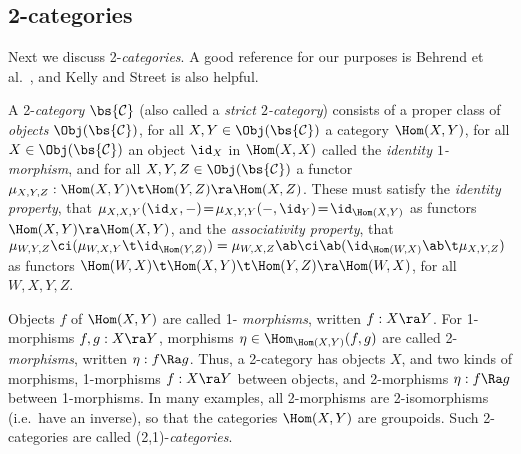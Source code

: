 \documentclass{article}
\begin{document}
\subsection{2-categories}
\label{dsA3}

Next we discuss 2-{\it categories}. A good reference for our
purposes is Behrend et al.\ \cite[App.~B]{BEFF}, and Kelly and
Street \cite{KeSt} is also helpful.

\begin{dfn} A 2-{\it category\/} $\bs{\cal C}$ (also called a {\it strict\/
$2$-category\/}) consists of a proper class of
{\it objects\/} $\Obj(\bs{\cal C})$, for all $X,Y\in\Obj(\bs{\cal
C})$ a category $\Hom(X,Y)$, for all $X\in\Obj(\bs{\cal C})$ an
object $\id_X$ in $\Hom(X,X)$ called the {\it identity
$1$-morphism}, and for all $X,Y,Z\in\Obj(\bs{\cal C})$ a functor
$\mu_{X,Y,Z}:\Hom(X,Y)\t\Hom(Y,Z)\ra\Hom(X,Z)$. These must satisfy
the {\it identity property}, that $\mu_{X,X,Y}(\id_X,-)\!=\!
\mu_{X,Y,Y}(-,\id_Y)\!=\!\id_{\Hom(X,Y)}$ as functors
$\Hom(X,Y)\ra\Hom(X,Y)$, and the {\it associativity property}, that
$\mu_{W,Y,Z}\ci(\mu_{W,X,Y}\t\id_{\Hom(Y,Z)})
=\mu_{W,X,Z}\ab\ci\ab(\id_{\Hom(W,X)}\ab\t\mu_{X,Y,Z})$ as functors
$\Hom(W,X)\t\Hom(X,Y)\t\Hom(Y,Z)\ra\Hom(W,X)$, for all~$W,X,Y,Z$.

Objects $f$ of $\Hom(X,Y)$ are called 1-{\it
morphisms}, written $f:X\ra Y$. For
1-morphisms $f,g:X\ra Y$, morphisms $\eta\in \Hom_{\Hom(X,Y)}(f,g)$
are called 2-{\it morphisms}, written
$\eta:f\Ra g$. Thus, a 2-category has objects $X$, and two kinds of
morphisms, 1-morphisms $f:X\ra Y$ between objects, and 2-morphisms
$\eta:f\Ra g$ between 1-morphisms. In many examples, all 2-morphisms
are 2-isomorphisms (i.e.\ have an inverse), so that the categories
$\Hom(X,Y)$ are groupoids. Such 2-categories
are called (2,1)-{\it categories}.
\label{dsAdef4}
\end{dfn}
\end{document}
